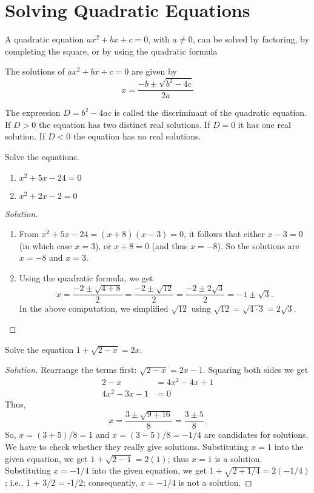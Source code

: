 \documentclass{ximera}
\begin{document}
\section{Solving Quadratic Equations}
A quadratic equation $ax^2 + bx + c = 0$, with $a \neq 0$, can be solved by factoring, by completing the square, or by using the quadratic formula

\begin{theorem}
The solutions of $ax^2+bx+c = 0$ are given by $$ x = \frac{-b \pm \sqrt{b^2-4c}}{2a} $$
\end{theorem}

The expression $D = b^2-4ac$ is called the discriminant of the quadratic equation.  If $D>0$ the equation has two distinct real solutions.  If $D=0$ it has one real solution.  If $D < 0$ the equation has no real solutions.

\begin{example}
Solve the equations.
\begin{enumerate}
	\item $x^2 + 5x - 24 = 0$
	\item $x^2 + 2x - 2 = 0$
\end{enumerate}
\end{example}
\begin{proof}[Solution]

\begin{enumerate}
	\item{From $x^2+5x-24 = (x+8)(x-3)=0$, it follows that either $x-3=0$ (in which case $x=3$), or $x+8=0$ (and thus $x= -8$).  So the solutions are $x= -8$ and $x=3$.}
	\item{Using the quadratic formula, we get \[ x = \frac{-2 \pm \sqrt{4+8}}{2} = \frac{-2\pm\sqrt{12}}{2} = \frac{-2\pm 2\sqrt{3}}{2} = -1 \pm \sqrt{3}.\]
		In the above computation, we simplified $\sqrt{12}$ using $\sqrt{12} = \sqrt{4 \cdot 3} = 2\sqrt{3}$.
		}
\end{enumerate}
\end{proof}

\begin{example}
Solve the equation $1 + \sqrt{2-x} = 2x$.
\end{example}
\begin{proof}[Solution]

Rearrange the terms first: $\sqrt{2-x} = 2x - 1$.  Squaring both sides we get
\begin{align*}
	2-x &= 4x^2-4x+1\\
	4x^2-3x-1 &= 0
\end{align*}
Thus,\[ x = \frac{3\pm \sqrt{9+16}}{8} = \frac{3 \pm 5}{8}.\]
So, $x = (3+5)/8 = 1$ and $x=(3-5)/8 = -1/4$ are candidates for solutions.  We have to check whether they really give solutions.
Substituting $x=1$ into the given equation, we get $1 + \sqrt{2-1} = 2(1)$; thus $x=1$ is a solution.  Substituting $x=-1/4$ into the
given equation, we get $1 + \sqrt{2+ 1/4} = 2(-1/4)$; i.e., 1 + 3/2 = -1/2; consequently, $x=-1/4$ is not a solution.
\end{proof}
\end{document}
